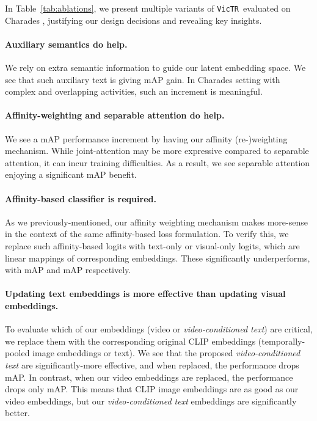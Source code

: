 \documentclass[10pt,twocolumn,letterpaper]{article}
\newcommand{\tref}[1]{Table~\ref{#1}}
\newcommand{\ours}{\texttt{VicTR}}
\begin{document}
In \tref{tab:ablations}, we present multiple variants of \ours~evaluated on Charades \cite{sigurdsson2016hollywood}, justifying our design decisions and revealing key insights.

\paragraph{Auxiliary semantics do help.} We rely on extra semantic information to guide our latent embedding space. We see that such auxiliary text is giving  mAP gain. In Charades setting with complex and overlapping activities, such an increment is meaningful.

\paragraph{Affinity-weighting and separable attention do help.} We see a   mAP performance increment by having our affinity (re-)weighting mechanism. While joint-attention may be more expressive compared to separable attention, it can incur training difficulties. As a result, we see separable attention enjoying a significant  mAP benefit.

\paragraph{Affinity-based classifier is required.} As we previously-mentioned, our affinity weighting mechanism makes more-sense in the context of the same affinity-based loss formulation. To verify this, we replace such affinity-based logits with text-only or visual-only logits, which are linear mappings of corresponding embeddings. These significantly underperforms, with  mAP and  mAP respectively.

\paragraph{Updating text embeddings is more effective than updating visual embeddings.} To evaluate which of our embeddings (video or \textit{video-conditioned text}) are critical, we replace them with the corresponding original CLIP \cite{radford2021clip} embeddings (temporally-pooled image embeddings or text). We see that the proposed \textit{video-conditioned text} are significantly-more effective, and when replaced, the performance drops  mAP. In contrast, when our video embeddings are replaced, the performance drops only  mAP. This means that CLIP image embeddings are as good as our video embeddings, but our \textit{video-conditioned text} embeddings are significantly better.
\end{document}
